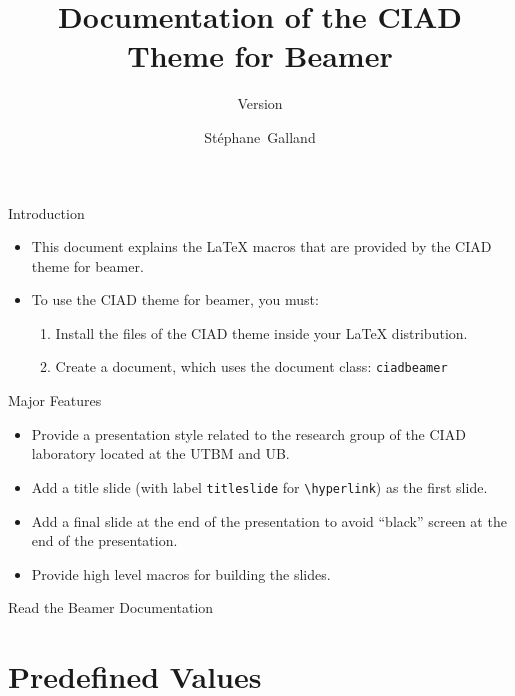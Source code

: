 \documentclass[english,sectioncirclenumberstyle]{ciadbeamer}
\title{Documentation of the CIAD Theme for Beamer}
\subtitle{Version \insertciadbeamerthemeversion}
\author[S.~Galland]{St\'ephane~Galland}
\begin{document}
\begin{frame}{Introduction}
	\begin{itemize}
	\item This document explains the {\LaTeX} macros that are provided by the CIAD theme for beamer.
	\vfill
	\item To use the CIAD theme for beamer, you must:
		\begin{enumerate}
		\item Install the files of the CIAD theme inside your {\LaTeX} distribution.
		\item Create a document, which uses the document class: \texttt{ciadbeamer}
		\end{enumerate}
	\end{itemize}
\end{frame}

\begin{frame}{Major Features}
	\begin{itemize}
	\item Provide a presentation style related to the research group of the CIAD laboratory located at the UTBM and UB.
	\vfill
	\item Add a title slide (with label \texttt{titleslide} for \texttt{{\textbackslash}hyperlink}) as the first slide.
	\vfill
	\item Add a final slide at the end of the presentation to avoid ``black'' screen at the end of the presentation.
	\vfill
	\item Provide high level macros for building the slides.
	\end{itemize}
\end{frame}

\begin{frame}{Read the Beamer Documentation}
	\huge
	\vspace{2em}
\end{frame}

\tableofcontentslide

\section{Predefined Values}
\sectiontableofcontentslide
\end{document}
